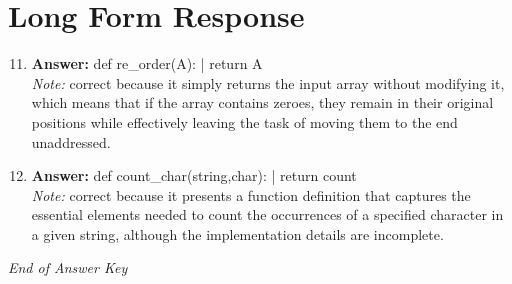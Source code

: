 \documentclass[12pt]{article}
\begin{document}
\section*{Long Form Response}
\begin{enumerate}[label=\arabic*.]
\setcounter{enumi}{10}
\item \textbf{Answer:} def re\_order(A): | return A
\\ \textit{Note:} correct because it simply returns the input array without modifying it, which means that if the array contains zeroes, they remain in their original positions while effectively leaving the task of moving them to the end unaddressed.
\item \textbf{Answer:} def count\_char(string,char): | return count
\\ \textit{Note:} correct because it presents a function definition that captures the essential elements needed to count the occurrences of a specified character in a given string, although the implementation details are incomplete.
\end{enumerate}

\vfill
\noindent\textit{End of Answer Key}
\end{document}
